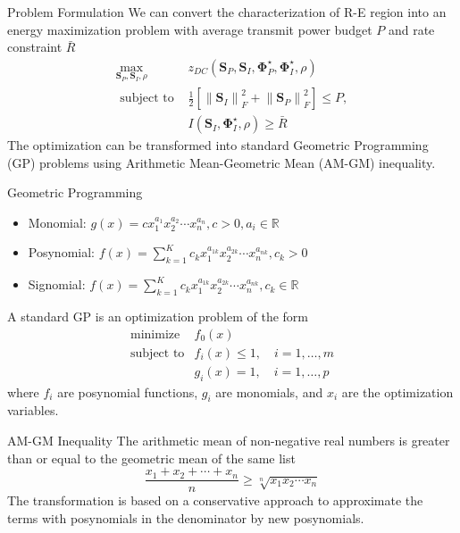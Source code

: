 \documentclass[xcolor={table}]{beamer}
\begin{document}
\begin{frame}[fragile=singleslide,t]
\begin{block}{Problem Formulation}
We can convert the characterization of R-E region into an energy maximization problem with average transmit power budget $P$ and rate constraint ${\bar R}$
\begin{eqnarray}\label{eqn:problem}
  {\mathop {\max }\limits_{{{\mathbf{S}}_P},{{\mathbf{S}}_I},\rho } }&{{z_{DC}}\left( {{{\mathbf{S}}_P},{{\mathbf{S}}_I},{\mathbf{\Phi }}_P^ \star ,{\mathbf{\Phi }}_I^ \star ,\rho } \right)} \label{eqn:original_target}\\
  {{\text{ subject to }}}&{\frac{1}{2}\left[ {\left\| {{{\mathbf{S}}_I}} \right\|_F^2 + \left\| {{{\mathbf{S}}_P}} \right\|_F^2} \right] \leqslant P,} \label{eqn:original_power_constraint} \\
  {}&{I\left( {{{\mathbf{S}}_I},{\mathbf{\Phi }}_I^ \star ,\rho } \right) \geqslant \bar R} \label{eqn:original_rate_constraint}
\end{eqnarray}
The optimization can be transformed into standard Geometric Programming (GP) problems using Arithmetic Mean-Geometric Mean (AM-GM) inequality.
\end{block}

\begin{block}{Geometric Programming}
\begin{itemize}
  \item Monomial: $g(x) = cx_1^{{a_1}}x_2^{{a_2}} \cdots x_n^{{a_n}},c > 0,{a_i} \in \mathbb{R}$
  \item Posynomial: $f(x) = \sum\limits_{k = 1}^K {{c_k}} x_1^{{a_{1k}}}x_2^{{a_{2k}}} \cdots x_n^{{a_{nk}}},{c_k} > 0$
  \item Signomial: $f(x) = \sum\limits_{k = 1}^K {{c_k}} x_1^{{a_{1k}}}x_2^{{a_{2k}}} \cdots x_n^{{a_{nk}}},{c_k} \in \mathbb{R}$
\end{itemize}
A standard GP is an optimization problem of the form
\begin{eqnarray}\label{eqn:gp}
  {{\text{minimize}}}&{{f_0}(x)} \\
  {{\text{subject to}}}&{{f_i}(x) \leqslant 1,\quad i = 1, \ldots ,m} \\
  {}&{{g_i}(x) = 1,\quad i = 1, \ldots ,p}
\end{eqnarray}
where ${{f_i}}$ are posynomial functions, ${{g_i}}$ are monomials, and ${{x_i}}$ are the optimization variables.
\end{block}

\begin{block}{AM-GM Inequality}
The arithmetic mean of non-negative real numbers is greater than or equal to the geometric mean of the same list
\begin{equation}\label{eqn:am_gm}
  \frac{{{x_1} + {x_2} +  \cdots  + {x_n}}}{n} \geqslant \sqrt[n]{{{x_1}{x_2} \cdots {x_n}}}
\end{equation}
The transformation is based on a conservative approach to approximate the terms with posynomials in the denominator by new posynomials.
\end{block}


\end{frame}
\end{document}
